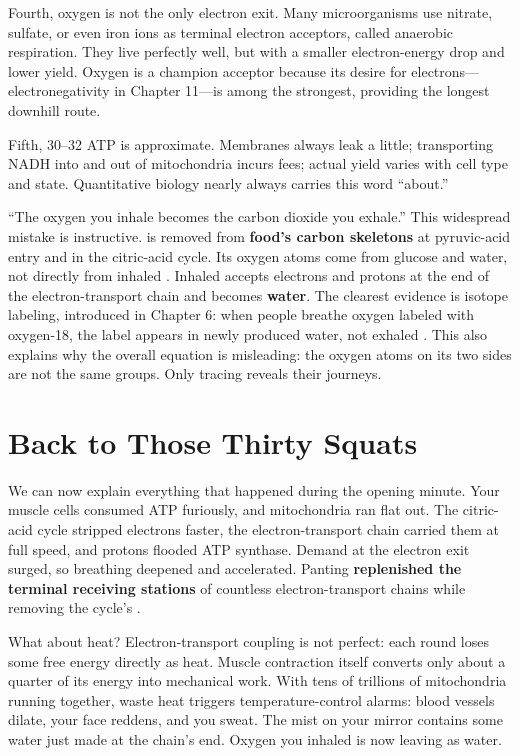 Fourth, oxygen is not the only electron exit. Many microorganisms use nitrate, sulfate, or even iron ions as terminal electron acceptors, called anaerobic respiration. They live perfectly well, but with a smaller electron-energy drop and lower yield. Oxygen is a champion acceptor because its desire for electrons---electronegativity in Chapter 11---is among the strongest, providing the longest downhill route.

Fifth, 30--32 ATP is approximate. Membranes always leak a little; transporting NADH into and out of mitochondria incurs fees; actual yield varies with cell type and state. Quantitative biology nearly always carries this word ``about.''

\begin{wuqu}
``The oxygen you inhale becomes the carbon dioxide you exhale.'' This widespread mistake is instructive.  is removed from \textbf{food's carbon skeletons} at pyruvic-acid entry and in the citric-acid cycle. Its oxygen atoms come from glucose and water, not directly from inhaled . Inhaled  accepts electrons and protons at the end of the electron-transport chain and becomes \textbf{water}. The clearest evidence is isotope labeling, introduced in Chapter 6: when people breathe oxygen labeled with oxygen-18, the label appears in newly produced water, not exhaled . This also explains why the overall equation is misleading: the oxygen atoms on its two sides are not the same groups. Only tracing reveals their journeys.
\end{wuqu}

\section{Back to Those Thirty Squats}

We can now explain everything that happened during the opening minute. Your muscle cells consumed ATP furiously, and mitochondria ran flat out. The citric-acid cycle stripped electrons faster, the electron-transport chain carried them at full speed, and protons flooded ATP synthase. Demand at the electron exit surged, so breathing deepened and accelerated. Panting \textbf{replenished the terminal receiving stations} of countless electron-transport chains while removing the cycle's .

What about heat? Electron-transport coupling is not perfect: each round loses some free energy directly as heat. Muscle contraction itself converts only about a quarter of its energy into mechanical work. With tens of trillions of mitochondria running together, waste heat triggers temperature-control alarms: blood vessels dilate, your face reddens, and you sweat. The mist on your mirror contains some water just made at the chain's end. Oxygen you inhaled is now leaving as water.

